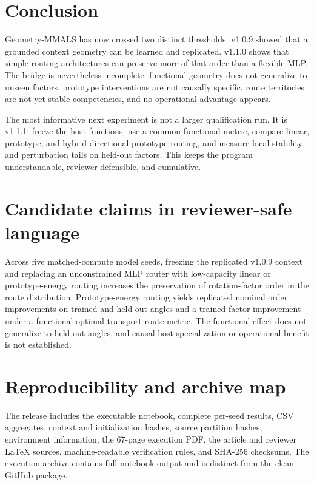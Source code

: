 \documentclass[11pt,a4paper]{article}
\begin{document}
\section{Conclusion}
Geometry-MMALS has now crossed two distinct thresholds. v1.0.9 showed that a grounded context geometry can be learned and replicated. v1.1.0 shows that simple routing architectures can preserve more of that order than a flexible MLP. The bridge is nevertheless incomplete: functional geometry does not generalize to unseen factors, prototype interventions are not causally specific, route territories are not yet stable competencies, and no operational advantage appears.

The most informative next experiment is not a larger qualification run. It is v1.1.1: freeze the host functions, use a common functional metric, compare linear, prototype, and hybrid directional-prototype routing, and measure local stability and perturbation tails on held-out factors. This keeps the program understandable, reviewer-defensible, and cumulative.

\appendix
\section{Candidate claims in reviewer-safe language}
\begin{plainbox}
Across five matched-compute model seeds, freezing the replicated v1.0.9 context and replacing an unconstrained MLP router with low-capacity linear or prototype-energy routing increases the preservation of rotation-factor order in the route distribution. Prototype-energy routing yields replicated nominal order improvements on trained and held-out angles and a trained-factor improvement under a functional optimal-transport route metric. The functional effect does not generalize to held-out angles, and causal host specialization or operational benefit is not established.
\end{plainbox}

\section{Reproducibility and archive map}
The release includes the executable notebook, complete per-seed results, CSV aggregates, context and initialization hashes, source partition hashes, environment information, the 67-page execution PDF, the article and reviewer LaTeX sources, machine-readable verification rules, and SHA-256 checksums. The execution archive contains full notebook output and is distinct from the clean GitHub package.

\printbibliography
\end{document}
